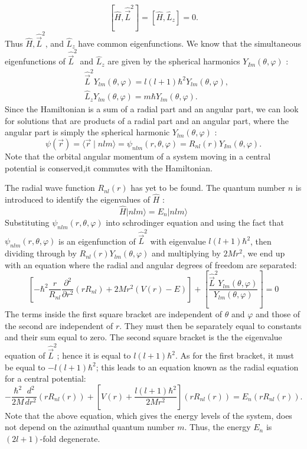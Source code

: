 $$
\left[\hat{H}, \hat{\vec{L}}^{2}\right]=\left[\hat{H}, \hat{L}_{z}\right]=0 .
$$
Thus $\hat{H}, \hat{\vec{L}}^{2}$, and $\hat{L}_{z}$ have common eigenfunctions. We know that the simultaneous eigenfunctions of $\hat{\vec{L}}^{2}$ and $\hat{L}_{z}$ are given by the spherical harmonics $Y_{I m}(\theta, \varphi)$ :
$$
\begin{aligned}
&\hat{\vec{L}}^{2} Y_{l m}(\theta, \varphi)=l(l+1) \hbar^{2} Y_{l m}(\theta, \varphi), \\
&\hat{L}_{z} Y_{l m}(\theta, \varphi)=m \hbar Y_{l m}(\theta, \varphi) .
\end{aligned}
$$
Since the Hamiltonian is a sum of a radial part and an angular part, we can look for solutions that are products of a radial part and an angular part, where the angular part is simply the spherical harmonic $Y_{l m}(\theta, \varphi)$ :
$$
\psi(\vec{r})=\langle\vec{r} \mid n l m\rangle=\psi_{n l m}(r, \theta, \varphi)=R_{n l}(r) Y_{I m}(\theta, \varphi) .
$$
Note that the orbital angular momentum of a system moving in a central potential is conserved,it commutes with the Hamiltonian.

The radial wave function $R_{n l}(r)$ has yet to be found. The quantum number $n$ is introduced to identify the eigenvalues of $\hat{H}$ :
$$
\hat{H}|n l m\rangle=E_{n}|n l m\rangle
$$
Substituting $\psi_{n l m}(r, \theta, \varphi)$ into schrodinger equation and using the fact that $\psi_{n l m}(r, \theta, \varphi)$ is an eigenfunction of $\hat{\vec{L}}^{2}$ with eigenvalue $l(l+1) \hbar^{2}$, then dividing through by $R_{n l}(r) Y_{l m}(\theta, \varphi)$ and multiplying by $2 M r^{2}$, we end up with an equation where the radial and angular degrees of freedom are separated:
$$
\left[-\hbar^{2} \frac{r}{R_{n l}} \frac{\partial^{2}}{\partial r^{2}}\left(r R_{n l}\right)+2 M r^{2}(V(r)-E)\right]+\left[\frac{\hat{\vec{L}}^{2} Y_{l m}(\theta, \varphi)}{Y_{l m}(\theta, \varphi)}\right]=0 
$$
The terms inside the first square bracket are independent of $\theta$ and $\varphi$ and those of the second are independent of $r$. They must then be separately equal to constants and their sum equal to zero. The second square bracket is the the eigenvalue equation of $\hat{\vec{L}}^{2}$; hence it is equal to $l(l+1) \hbar^{2} .$ As for the first bracket, it must be equal to $-l(l+1) \hbar^{2}$; this leads to an equation known as the radial equation for a central potential:
$$
-\frac{\hbar^{2}}{2 M} \frac{d^{2}}{d r^{2}}\left(r R_{n l}(r)\right)+\left[V(r)+\frac{l(l+1) \hbar^{2}}{2 M r^{2}}\right]\left(r R_{n l}(r)\right)=E_{n}\left(r R_{n l}(r)\right) .
$$
Note that the above equation, which gives the energy levels of the system, does not depend on the azimuthal quantum number $m$. Thus, the energy $E_{n}$ is $(2 l+1)$-fold degenerate.

